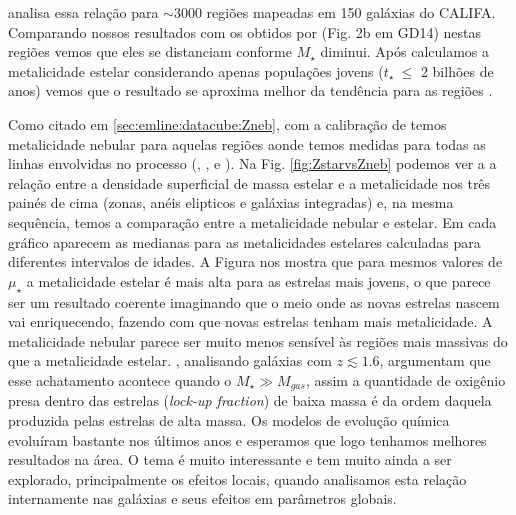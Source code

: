 \citet{Sanchez.etal.2013a} analisa essa relação para $\sim 3000$ regiões \Hii mapeadas em 150
galáxias do CALIFA. Comparando nossos resultados com os obtidos por \citeauthor{Sanchez.etal.2013a}
(Fig. 2b em GD14) nestas regiões vemos que eles se distanciam conforme $M_\star$ diminui.
Após calculamos a metalicidade estelar considerando apenas populações jovens ($t_\star\ \leq$ 2
bilhões de anos) vemos que o resultado se aproxima melhor da tendência para as regiões \Hii.

Como citado em \ref{sec:emline:datacube:Zneb}, com a calibração de \citet{Marino.etal.2013a} temos
metalicidade nebular para aquelas regiões aonde temos medidas para todas as linhas envolvidas no
processo (\Hbeta, \oIII, \Halpha e \nII). Na Fig. \ref{fig:ZstarvsZneb} podemos ver a a relação
entre a densidade superficial de massa estelar e a metalicidade nos três painés de cima (zonas,
anéis elipticos e galáxias integradas) e, na mesma sequência, temos a comparação entre a
metalicidade nebular e estelar. Em cada gráfico aparecem as medianas para as metalicidades estelares
calculadas para diferentes intervalos de idades. A Figura nos mostra que para mesmos valores de
$\mu_\star$ a metalicidade estelar é mais alta para as estrelas mais jovens, o que parece ser um
resultado coerente imaginando que o meio onde as novas estrelas nascem vai enriquecendo, fazendo com
que novas estrelas tenham mais metalicidade. A metalicidade nebular parece ser muito menos sensível
às regiões mais massivas do que a metalicidade estelar. \citet{Zahid.etal.2014a}, analisando
galáxias com $z \lesssim 1.6$, argumentam que esse achatamento acontece quando o $M_\star \gg
M_{gas}$, assim a quantidade de oxigênio presa dentro das estrelas ({\em lock-up fraction}) de baixa
massa é da ordem daquela produzida pelas estrelas de alta massa. Os modelos de evolução química
evoluíram bastante nos últimos anos \citep[e.g., ][]{Lilly.etal.2013a, Peng.Maiolino.2014a,
Ascasibar.etal.2015a, Peng.Maiolino.Cochrane.2015a} e esperamos que logo tenhamos melhores
resultados na área. O tema é muito interessante e tem muito ainda a ser explorado, principalmente os
efeitos locais, quando analisamos esta relação internamente nas galáxias e seus efeitos em
parâmetros globais.

